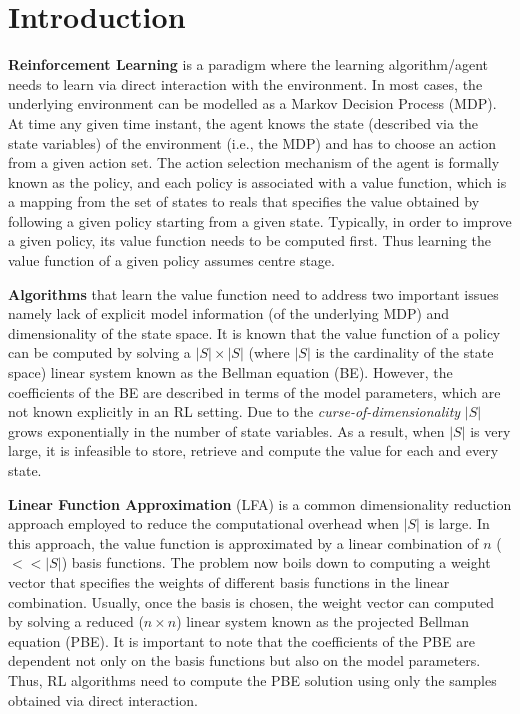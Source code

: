 \section{Introduction}
\textbf{Reinforcement Learning} is a paradigm where the learning algorithm/agent needs to learn via direct interaction with the environment. In most cases, the underlying environment can be modelled as a Markov Decision Process (MDP). At time any given time instant, the agent knows the state (described via the state variables) of the environment (i.e., the MDP) and has to choose an action from a given action set. The action selection mechanism of the agent is formally known as the policy, and each policy is associated with a value function, which is a mapping from the set of states to reals that specifies the value obtained by following a given policy starting from a given state. Typically, in order to improve a given policy, its value function needs to be computed first. Thus learning the value function of a given policy assumes centre stage.\par
\textbf{Algorithms} that learn the value function need to address two important issues namely lack of explicit model information (of the underlying MDP) and dimensionality of the state space. It is known that the value function of a policy can be computed by solving a $|S|\times|S|$ (where $|S|$ is the cardinality of the state space) linear system known as the Bellman equation (BE). However, the coefficients of the BE are described in terms of the model parameters, which are not known explicitly in an RL setting. Due to the \emph{curse-of-dimensionality} $|S|$ grows exponentially in the number of state variables. As a result, when $|S|$ is very large, it is infeasible to store, retrieve and compute the value for each and every state.\par
\textbf{Linear Function Approximation} (LFA) is a common dimensionality reduction approach employed to reduce the computational overhead when $|S|$ is large. In this approach, the value function is approximated by a linear combination of $n$ ($<<|S|$) basis functions. The problem now boils down to computing a weight vector that specifies the weights of different basis functions in the linear combination. Usually, once the basis is chosen, the weight vector can computed by solving a reduced ($n\times n$) linear system known as the projected Bellman equation (PBE). It is important to note that the coefficients of the PBE are dependent not only on the basis functions but also on the model parameters. Thus, RL algorithms need to compute the PBE solution using only the samples obtained via direct interaction.\par
